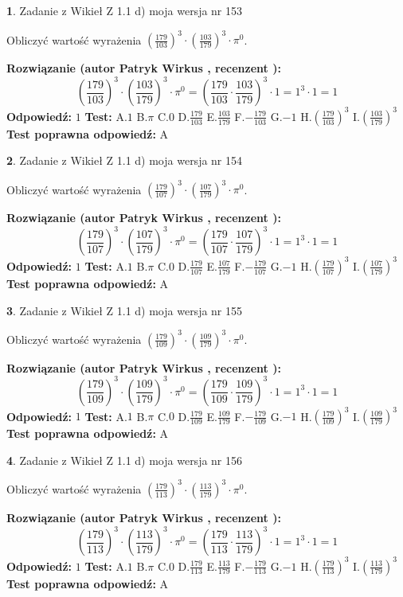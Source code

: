 \documentclass[12pt, a4paper]{article}
\theoremstyle{definition} %
\newtheorem{zad}{}
\newcommand{\zadStart}[1]{\begin{zad}#1\newline}
\newcommand{\zadStop}{\end{zad}}
\newcommand{\rozwStart}[2]{\noindent \textbf{Rozwiązanie (autor #1 , recenzent #2): }\newline}
\newcommand{\rozwStop}{\newline}
\newcommand{\odpStart}{\noindent \textbf{Odpowiedź:}\newline}
\newcommand{\odpStop}{\newline}
\newcommand{\testStart}{\noindent \textbf{Test:}\newline}
\newcommand{\testStop}{\newline}
\newcommand{\kluczStart}{\noindent \textbf{Test poprawna odpowiedź:}\newline}
\newcommand{\kluczStop}{\newline}
\begin{document}
\zadStart{Zadanie z Wikieł Z 1.1 d) moja wersja nr 153}

Obliczyć wartość wyrażenia $(\frac{179}{103})^{3} \cdot (\frac{103}{179})^{3} \cdot \pi^{0}$.
\zadStop
\rozwStart{Patryk Wirkus}{}
$$(\frac{179}{103})^{3} \cdot (\frac{103}{179})^{3} \cdot \pi^{0} = (\frac{179}{103} \cdot \frac{103}{179})^{3} \cdot 1 = 1^{3} \cdot 1 = 1$$
\rozwStop
\odpStart
$1$
\odpStop
\testStart
A.$1$ B.$\pi$ C.$0$ D.$\frac{179}{103}$ E.$\frac{103}{179}$
F.$-\frac{179}{103}$ G.$-1$
H.$(\frac{179}{103})^{3}$
I.$(\frac{103}{179})^{3}$
\testStop
\kluczStart
A
\kluczStop



\zadStart{Zadanie z Wikieł Z 1.1 d) moja wersja nr 154}

Obliczyć wartość wyrażenia $(\frac{179}{107})^{3} \cdot (\frac{107}{179})^{3} \cdot \pi^{0}$.
\zadStop
\rozwStart{Patryk Wirkus}{}
$$(\frac{179}{107})^{3} \cdot (\frac{107}{179})^{3} \cdot \pi^{0} = (\frac{179}{107} \cdot \frac{107}{179})^{3} \cdot 1 = 1^{3} \cdot 1 = 1$$
\rozwStop
\odpStart
$1$
\odpStop
\testStart
A.$1$ B.$\pi$ C.$0$ D.$\frac{179}{107}$ E.$\frac{107}{179}$
F.$-\frac{179}{107}$ G.$-1$
H.$(\frac{179}{107})^{3}$
I.$(\frac{107}{179})^{3}$
\testStop
\kluczStart
A
\kluczStop



\zadStart{Zadanie z Wikieł Z 1.1 d) moja wersja nr 155}

Obliczyć wartość wyrażenia $(\frac{179}{109})^{3} \cdot (\frac{109}{179})^{3} \cdot \pi^{0}$.
\zadStop
\rozwStart{Patryk Wirkus}{}
$$(\frac{179}{109})^{3} \cdot (\frac{109}{179})^{3} \cdot \pi^{0} = (\frac{179}{109} \cdot \frac{109}{179})^{3} \cdot 1 = 1^{3} \cdot 1 = 1$$
\rozwStop
\odpStart
$1$
\odpStop
\testStart
A.$1$ B.$\pi$ C.$0$ D.$\frac{179}{109}$ E.$\frac{109}{179}$
F.$-\frac{179}{109}$ G.$-1$
H.$(\frac{179}{109})^{3}$
I.$(\frac{109}{179})^{3}$
\testStop
\kluczStart
A
\kluczStop



\zadStart{Zadanie z Wikieł Z 1.1 d) moja wersja nr 156}

Obliczyć wartość wyrażenia $(\frac{179}{113})^{3} \cdot (\frac{113}{179})^{3} \cdot \pi^{0}$.
\zadStop
\rozwStart{Patryk Wirkus}{}
$$(\frac{179}{113})^{3} \cdot (\frac{113}{179})^{3} \cdot \pi^{0} = (\frac{179}{113} \cdot \frac{113}{179})^{3} \cdot 1 = 1^{3} \cdot 1 = 1$$
\rozwStop
\odpStart
$1$
\odpStop
\testStart
A.$1$ B.$\pi$ C.$0$ D.$\frac{179}{113}$ E.$\frac{113}{179}$
F.$-\frac{179}{113}$ G.$-1$
H.$(\frac{179}{113})^{3}$
I.$(\frac{113}{179})^{3}$
\testStop
\kluczStart
A
\kluczStop
\end{document}
